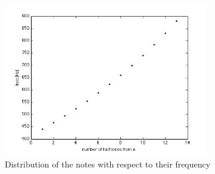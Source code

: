 \begin{figure}[h!]
  \centering
    \includegraphics[width=0.8\textwidth]{images/music_freq_distribution.jpg}
  \caption{Distribution of the notes with respect to their frequency}
\end{figure}
